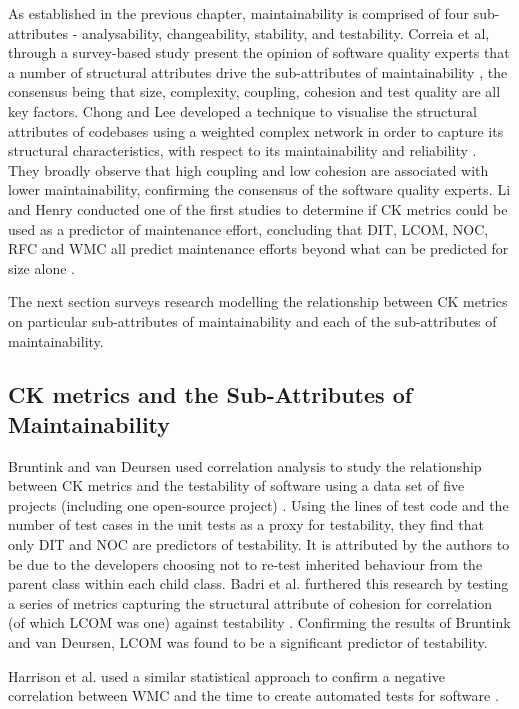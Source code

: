 As established in the previous chapter, maintainability is comprised of four sub-attributes - analysability, changeability, stability, and testability. Correia et al, through a survey-based study present the opinion of software quality experts that a number of structural attributes drive the sub-attributes of maintainability \citep{correia2009survey}, the consensus being that size, complexity, coupling, cohesion and test quality are all key factors. Chong and Lee developed a technique to visualise the structural attributes of codebases using a weighted complex network in order to capture its structural characteristics, with respect to its maintainability and reliability \citep{chong2015analyzing}. They broadly observe that high coupling and low cohesion are associated with lower maintainability, confirming the consensus of the software quality experts. Li and Henry conducted one of the first studies to determine if CK metrics could be used as a predictor of maintenance effort, concluding that DIT, LCOM, NOC, RFC and WMC all predict maintenance efforts beyond what can be predicted for size alone \citep{li1993object}.

The next section surveys research modelling the relationship between CK metrics on particular sub-attributes of maintainability and each of the sub-attributes of maintainability.

\subsection{CK metrics and the Sub-Attributes of Maintainability}
Bruntink and van Deursen used correlation analysis to study the relationship between CK metrics and the testability of software using a data set of five projects (including one open-source project) \citep{bruntink2006empirical}. Using the lines of test code and the number of test cases in the unit tests as a proxy for testability, they find that only DIT and NOC are predictors of testability. It is attributed by the authors to be due to the developers choosing not to re-test inherited behaviour from the parent class within each child class. Badri et al. furthered this research by testing a series of metrics capturing the structural attribute of cohesion for correlation (of which LCOM was one) against testability \citep{badri2011empirical}. Confirming the results of Bruntink and van Deursen, LCOM was found to be a significant predictor of testability. 

Harrison et al. used a similar statistical approach to confirm a negative correlation between WMC and the time to create automated tests for software \citep{harrison1998investigation}. 

